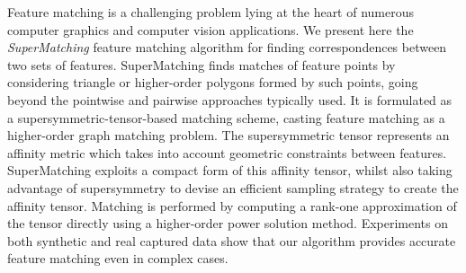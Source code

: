 Feature matching is a challenging problem lying at the heart of numerous computer graphics and computer vision applications.
We present here the \emph{SuperMatching} feature matching algorithm for finding correspondences between two sets of features.
SuperMatching finds matches of feature points by considering triangle or higher-order polygons formed by such points, going beyond the pointwise and pairwise approaches typically used.
It is formulated as a supersymmetric-tensor-based matching scheme,
casting feature matching as a higher-order graph matching problem.
The supersymmetric tensor represents an affinity metric which takes into account geometric constraints between features.
SuperMatching exploits a compact form of this affinity tensor,
whilst also taking advantage of supersymmetry to devise an
efficient sampling strategy to create the affinity tensor.
Matching is performed by computing a rank-one approximation of the tensor directly
using a higher-order power solution method.
Experiments on both synthetic and real captured data show that
our algorithm provides accurate feature matching even in complex cases. 